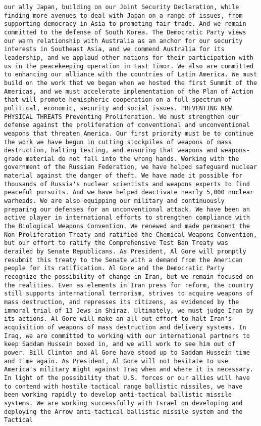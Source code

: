 \documentclass[
]{article}
\begin{document}
\begin{verbatim}
our ally Japan, building on our Joint Security Declaration, while finding more avenues to deal with Japan on a range of issues, from supporting democracy in Asia to promoting fair trade. And we remain committed to the defense of South Korea. The Democratic Party views our warm relationship with Australia as an anchor for our security interests in Southeast Asia, and we commend Australia for its leadership, and we applaud other nations for their participation with us in the peacekeeping operation in East Timor. We also are committed to enhancing our alliance with the countries of Latin America. We must build on the work that we began when we hosted the first Summit of the Americas, and we must accelerate implementation of the Plan of Action that will promote hemispheric cooperation on a full spectrum of political, economic, security and social issues. PREVENTING NEW PHYSICAL THREATS Preventing Proliferation. We must strengthen our defense against the proliferation of conventional and unconventional weapons that threaten America. Our first priority must be to continue the work we have begun in cutting stockpiles of weapons of mass destruction, halting testing, and ensuring that weapons and weapons-grade material do not fall into the wrong hands. Working with the government of the Russian Federation, we have helped safeguard nuclear material against the danger of theft. We have made it possible for thousands of Russia's nuclear scientists and weapons experts to find peaceful pursuits. And we have helped deactivate nearly 5,000 nuclear warheads. We are also equipping our military and continuously preparing our defenses for an unconventional attack. We have been an active player in international efforts to strengthen compliance with the Biological Weapons Convention. We renewed and made permanent the Non-Proliferation Treaty and ratified the Chemical Weapons Convention, but our effort to ratify the Comprehensive Test Ban Treaty was derailed by Senate Republicans. As President, Al Gore will promptly resubmit this treaty to the Senate with a demand from the American people for its ratification. Al Gore and the Democratic Party recognize the possibility of change in Iran, but we remain focused on the realities. Even as elements in Iran press for reform, the country still supports international terrorism, strives to acquire weapons of mass destruction, and represses its citizens, as evidenced by the immoral trial of 13 Jews in Shiraz. Ultimately, we must judge Iran by its actions. Al Gore will make an all-out effort to halt Iran's acquisition of weapons of mass destruction and delivery systems. In Iraq, we are committed to working with our international partners to keep Saddam Hussein boxed in, and we will work to see him out of power. Bill Clinton and Al Gore have stood up to Saddam Hussein time and time again. As President, Al Gore will not hesitate to use America's military might against Iraq when and where it is necessary. In light of the possibility that U.S. forces or our allies will have to contend with hostile tactical range ballistic missiles, we have been working rapidly to develop anti-tactical ballistic missile systems. We are working successfully with Israel on developing and deploying the Arrow anti-tactical ballistic missile system and the Tactical 
\end{verbatim}
\end{document}
